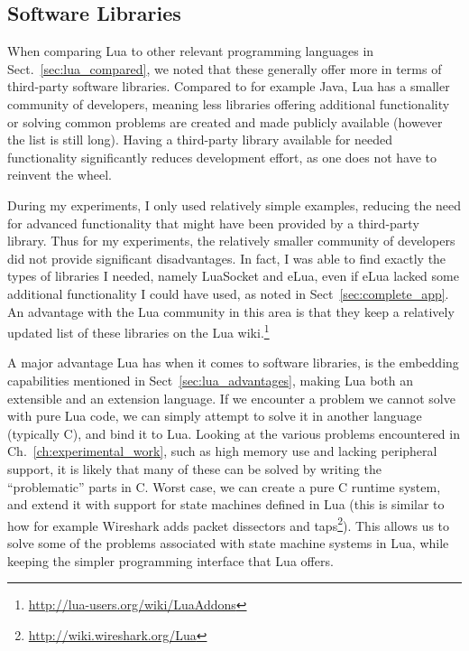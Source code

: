 \subsection{Software Libraries}
\label{sec:disq_libraries}
When comparing Lua to other relevant programming languages in Sect.~\ref{sec:lua_compared}, we noted that these generally offer more in terms of third-party software libraries. Compared to for example Java, Lua has a smaller community of developers, meaning less libraries offering additional functionality or solving common problems are created and made publicly available (however the list is still long). Having a third-party library available for needed functionality significantly reduces development effort, as one does not have to reinvent the wheel.

\noindent
During my experiments, I only used relatively simple examples, reducing the need for advanced functionality that might have been provided by a third-party library. Thus for my experiments, the relatively smaller community of developers did not provide significant disadvantages. In fact, I was able to find exactly the types of libraries I needed, namely LuaSocket and eLua, even if eLua lacked some additional functionality I could have used, as noted in Sect~\ref{sec:complete_app}. An advantage with the Lua community in this area is that they keep a relatively updated list of these libraries on the Lua wiki.\footnote{\url{http://lua-users.org/wiki/LuaAddons}}

\noindent
A major advantage Lua has when it comes to software libraries, is the embedding capabilities mentioned in Sect~\ref{sec:lua_advantages}, making Lua both an extensible and an extension language. If we encounter a problem we cannot solve with pure Lua code, we can simply attempt to solve it in another language (typically C), and bind it to Lua. Looking at the various problems encountered in Ch.~\ref{ch:experimental_work}, such as high memory use and lacking peripheral support, it is likely that many of these can be solved by writing the ``problematic'' parts in C. Worst case, we can create a pure C runtime system, and extend it with support for state machines defined in Lua (this is similar to how for example Wireshark adds packet dissectors and taps\footnote{\url{http://wiki.wireshark.org/Lua}}). This allows us to solve some of the problems associated with state machine systems in Lua, while keeping the simpler programming interface that Lua offers.


